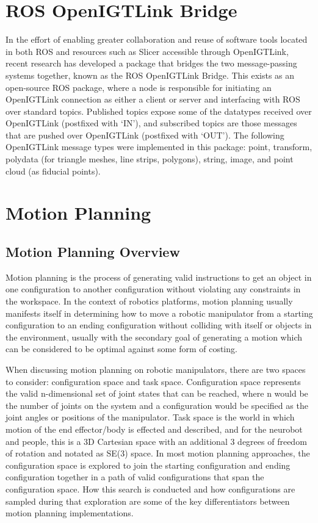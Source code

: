 \documentclass[12pt]{report}
\begin{document}
\section{ROS OpenIGTLink Bridge}
\label{sec:rosOpenIgtlinkBridge}
In the effort of enabling greater collaboration and reuse of software tools located in both ROS and resources such as Slicer accessible through OpenIGTLink, recent research has developed a package that bridges the two message-passing systems together, known as the ROS OpenIGTLink Bridge. \cite{rosOpenIGTLinkBridge} This exists as an open-source ROS package, where a node is responsible for initiating an OpenIGTLink connection as either a client or server and interfacing with ROS over standard topics. Published topics expose some of the datatypes received over OpenIGTLink (postfixed with `IN'), and subscribed topics are those messages that are pushed over OpenIGTLink (postfixed with `OUT'). The following OpenIGTLink message types were implemented in this package: point, transform, polydata (for triangle meshes, line strips, polygons), string, image, and point cloud (as fiducial points).


\section{Motion Planning}
\label{sec:motionPlanning}

\subsection{Motion Planning Overview}
Motion planning is the process of generating valid instructions to get an object in one configuration to another configuration without violating any constraints in the workspace. In the context of robotics platforms, motion planning usually manifests itself in determining how to move a robotic manipulator from a starting configuration to an ending configuration without colliding with itself or objects in the environment, usually with the secondary goal of generating a motion which can be considered to be optimal against some form of costing. 

When discussing motion planning on robotic manipulators, there are two spaces to consider: configuration space and task space. Configuration space represents the valid n-dimensional set of joint states that can be reached, where n would be the number of joints on the system and a configuration would be specified as the joint angles or positions of the manipulator. Task space is the world in which motion of the end effector/body is effected and described, and for the neurobot and people, this is a 3D Cartesian space with an additional 3 degrees of freedom of rotation and notated as SE(3) space. In most motion planning approaches, the configuration space is explored to join the starting configuration and ending configuration together in a path of valid configurations that span the configuration space. How this search is conducted and how configurations are sampled during that exploration are some of the key differentiators between motion planning implementations.
\end{document}
